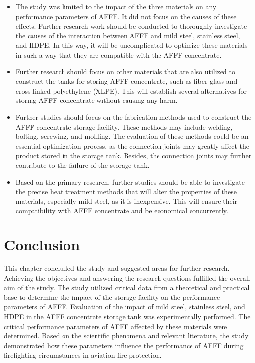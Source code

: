 \begin{itemize}
    \item The study was limited to the impact of the three materials on any performance parameters of AFFF. It did not focus on the causes of these effects. Further research work should be conducted to thoroughly investigate the causes of the interaction between AFFF and mild steel, stainless steel, and HDPE. In this way, it will be uncomplicated to optimize these materials in such a way that they are compatible with the AFFF concentrate.
    \item Further research should focus on other materials that are also utilized to construct the tanks for storing AFFF concentrate, such as fiber glass and cross-linked polyethylene (XLPE). This will establish several alternatives for storing AFFF concentrate without causing any harm. 
    \item  Further studies should focus on the fabrication methods used to construct the AFFF concentrate storage facility. These methods may include welding, bolting, screwing, and molding. The evaluation of these methods could be an essential optimization process, as the connection joints may greatly affect the product stored in the storage tank. Besides, the connection joints may further contribute to the failure of the storage tank. 
    \item Based on the primary research, further studies should be able to investigate the precise heat treatment methods that will alter the properties of these materials, especially mild steel, as it is inexpensive. This will ensure their compatibility with AFFF concentrate and be economical concurrently.   
\end{itemize}

\section{Conclusion}
This chapter concluded the study and suggested areas for further research. Achieving the objectives and answering the research questions fulfilled the overall aim of the study. The study utilized critical data from a theoretical and practical base to determine the impact of the storage facility on the performance parameters of AFFF. Evaluation of the impact of mild steel, stainless steel, and HDPE in the AFFF concentrate storage tank was experimentally performed. The critical performance parameters of AFFF affected by these materials were determined. Based on the scientific phenomena and relevant literature, the study demonstrated how these parameters influence the performance of AFFF during firefighting circumstances in aviation fire protection. 
